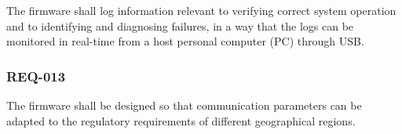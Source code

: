 \documentclass[11pt,a4paper]{article}
\begin{document}
The firmware shall log information relevant to verifying correct system
operation and to identifying and diagnosing failures, in a way that the logs can
be monitored in real-time from a host personal computer (PC) through USB.

\subsubsection{REQ-013}

The firmware shall be designed so that communication parameters can be adapted
to the regulatory requirements of different geographical regions.
\end{document}
